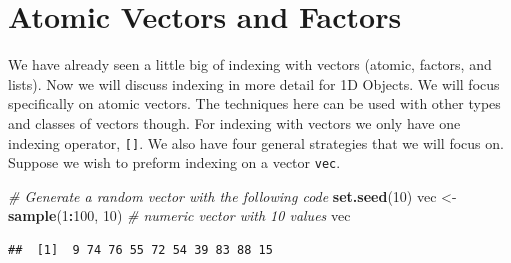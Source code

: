 \documentclass[
]{book}
\newenvironment{Shaded}{\begin{snugshade}}{\end{snugshade}}
\newcommand{\CommentTok}[1]{\textcolor[rgb]{0.56,0.35,0.01}{\textit{#1}}}
\newcommand{\DecValTok}[1]{\textcolor[rgb]{0.00,0.00,0.81}{#1}}
\newcommand{\KeywordTok}[1]{\textcolor[rgb]{0.13,0.29,0.53}{\textbf{#1}}}
\newcommand{\NormalTok}[1]{#1}
\newcommand{\OperatorTok}[1]{\textcolor[rgb]{0.81,0.36,0.00}{\textbf{#1}}}
\newcommand{\StringTok}[1]{\textcolor[rgb]{0.31,0.60,0.02}{#1}}
\begin{document}
\hypertarget{VectorIndex}{%
\section{Atomic Vectors and Factors}\label{VectorIndex}}

We have already seen a little big of indexing with vectors (atomic, factors, and lists). Now we will discuss indexing in more detail for 1D Objects. We will focus specifically on atomic vectors. The techniques here can be used with other types and classes of vectors though. For indexing with vectors we only have one indexing operator, \texttt{{[}{]}}. We also have four general strategies that we will focus on. Suppose we wish to preform indexing on a vector \texttt{vec}.

\begin{Shaded}
\begin{Highlighting}[]
\CommentTok{# Generate a random vector with the following code}
\KeywordTok{set.seed}\NormalTok{(}\DecValTok{10}\NormalTok{)}
\NormalTok{vec <-}\StringTok{ }\KeywordTok{sample}\NormalTok{(}\DecValTok{1}\OperatorTok{:}\DecValTok{100}\NormalTok{, }\DecValTok{10}\NormalTok{)  }\CommentTok{# numeric vector with 10 values}
\NormalTok{vec}
\end{Highlighting}
\end{Shaded}

\begin{verbatim}
##  [1]  9 74 76 55 72 54 39 83 88 15
\end{verbatim}
\end{document}
